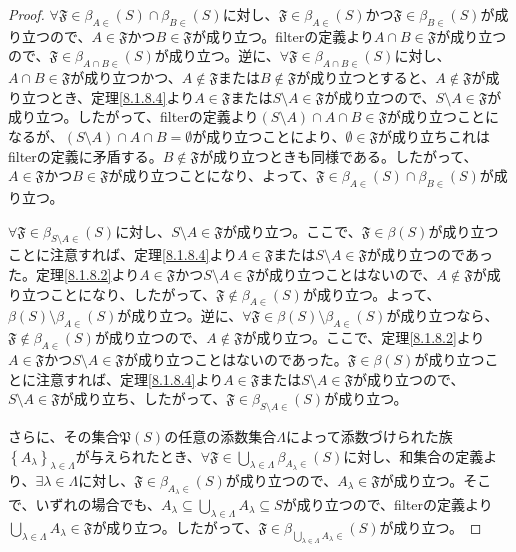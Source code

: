 \documentclass[dvipdfmx]{jsarticle}
\begin{document}
\begin{proof}
$\mathfrak{\forall F \in}\beta_{A \in}(S) \cap \beta_{B \in}(S)$に対し、$\mathfrak{F}\in \beta_{A \in}(S)$かつ$\mathfrak{F}\in \beta_{B \in}(S)$が成り立つので、$A \in \mathfrak{F}$かつ$B \in \mathfrak{F}$が成り立つ。filterの定義より$A \cap B \in \mathfrak{F}$が成り立つので、$\mathfrak{F}\in \beta_{A \cap B \in}(S)$が成り立つ。逆に、$\mathfrak{\forall F \in}\beta_{A \cap B \in}(S)$に対し、$A \cap B \in \mathfrak{F}$が成り立つかつ、$A \notin \mathfrak{F}$または$B \notin \mathfrak{F}$が成り立つとすると、$A \notin \mathfrak{F}$が成り立つとき、定理\ref{8.1.8.4}より$A \in \mathfrak{F}$または$S \setminus A \in \mathfrak{F}$が成り立つので、$S \setminus A \in \mathfrak{F}$が成り立つ。したがって、filterの定義より$(S \setminus A) \cap A \cap B \in \mathfrak{F}$が成り立つことになるが、$(S \setminus A) \cap A \cap B = \emptyset$が成り立つことにより、$\emptyset \in \mathfrak{F}$が成り立ちこれはfilterの定義に矛盾する。$B \notin \mathfrak{F}$が成り立つときも同様である。したがって、$A \in \mathfrak{F}$かつ$B \in \mathfrak{F}$が成り立つことになり、よって、$\mathfrak{F}\in \beta_{A \in}(S) \cap \beta_{B \in}(S)$が成り立つ。\par
$\mathfrak{\forall F \in}\beta_{S \setminus A \in}(S)$に対し、$S \setminus A \in \mathfrak{F}$が成り立つ。ここで、$\mathfrak{F}\in \beta(S)$が成り立つことに注意すれば、定理\ref{8.1.8.4}より$A \in \mathfrak{F}$または$S \setminus A \in \mathfrak{F}$が成り立つのであった。定理\ref{8.1.8.2}より$A \in \mathfrak{F}$かつ$S \setminus A \in \mathfrak{F}$が成り立つことはないので、$A \notin \mathfrak{F}$が成り立つことになり、したがって、$\mathfrak{F \notin}\beta_{A \in}(S)$が成り立つ。よって、$\beta(S) \setminus \beta_{A \in}(S)$が成り立つ。逆に、$\mathfrak{\forall F \in}\beta(S) \setminus \beta_{A \in}(S)$が成り立つなら、$\mathfrak{F \notin}\beta_{A \in}(S)$が成り立つので、$A \notin \mathfrak{F}$が成り立つ。ここで、定理\ref{8.1.8.2}より$A \in \mathfrak{F}$かつ$S \setminus A \in \mathfrak{F}$が成り立つことはないのであった。$\mathfrak{F}\in \beta(S)$が成り立つことに注意すれば、定理\ref{8.1.8.4}より$A \in \mathfrak{F}$または$S \setminus A \in \mathfrak{F}$が成り立つので、$S \setminus A \in \mathfrak{F}$が成り立ち、したがって、$\mathfrak{F}\in \beta_{S \setminus A \in}(S)$が成り立つ。\par
さらに、その集合$\mathfrak{P}(S)$の任意の添数集合$\varLambda$によって添数づけられた族$\left\{ A_{\lambda} \right\}_{\lambda \in \varLambda}$が与えられたとき、$\mathfrak{\forall F \in}\bigcup_{\lambda \in \varLambda} {\beta_{A_{\lambda} \in}(S)}$に対し、和集合の定義より、$\exists\lambda \in \varLambda$に対し、$\mathfrak{F}\in \beta_{A_{\lambda} \in}(S)$が成り立つので、$A_{\lambda}\in \mathfrak{F}$が成り立つ。そこで、いずれの場合でも、$A_{\lambda} \subseteq \bigcup_{\lambda \in \varLambda} A_{\lambda} \subseteq S$が成り立つので、filterの定義より$\bigcup_{\lambda \in \varLambda} A_{\lambda}\in \mathfrak{F}$が成り立つ。したがって、$\mathfrak{F}\in \beta_{\bigcup_{\lambda \in \varLambda} A_{\lambda} \in}(S)$が成り立つ。\par

\end{proof}
\end{document}
